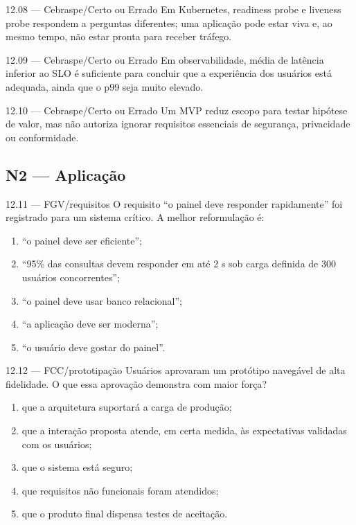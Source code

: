 \begin{questao}{ 12.08 — Cebraspe/Certo ou Errado}
Em Kubernetes, readiness probe e liveness probe respondem a perguntas diferentes; uma aplicação pode estar viva e, ao mesmo tempo, não estar pronta para receber tráfego.
\end{questao}

\begin{questao}{ 12.09 — Cebraspe/Certo ou Errado}
Em observabilidade, média de latência inferior ao SLO é suficiente para concluir que a experiência dos usuários está adequada, ainda que o p99 seja muito elevado.
\end{questao}

\begin{questao}{ 12.10 — Cebraspe/Certo ou Errado}
Um MVP reduz escopo para testar hipótese de valor, mas não autoriza ignorar requisitos essenciais de segurança, privacidade ou conformidade.
\end{questao}

\subsection*{N2 — Aplicação}

\begin{questao}{ 12.11 — FGV/requisitos}
O requisito ``o painel deve responder rapidamente'' foi registrado para um sistema crítico. A melhor reformulação é:
\begin{enumerate}[label=\Alph*)]
\item ``o painel deve ser eficiente'';
\item ``95\% das consultas devem responder em até 2 s sob carga definida de 300 usuários concorrentes'';
\item ``o painel deve usar banco relacional'';
\item ``a aplicação deve ser moderna'';
\item ``o usuário deve gostar do painel''.
\end{enumerate}
\end{questao}

\begin{questao}{ 12.12 — FCC/prototipação}
Usuários aprovaram um protótipo navegável de alta fidelidade. O que essa aprovação demonstra com maior força?
\begin{enumerate}[label=\Alph*)]
\item que a arquitetura suportará a carga de produção;
\item que a interação proposta atende, em certa medida, às expectativas validadas com os usuários;
\item que o sistema está seguro;
\item que requisitos não funcionais foram atendidos;
\item que o produto final dispensa testes de aceitação.
\end{enumerate}
\end{questao}

